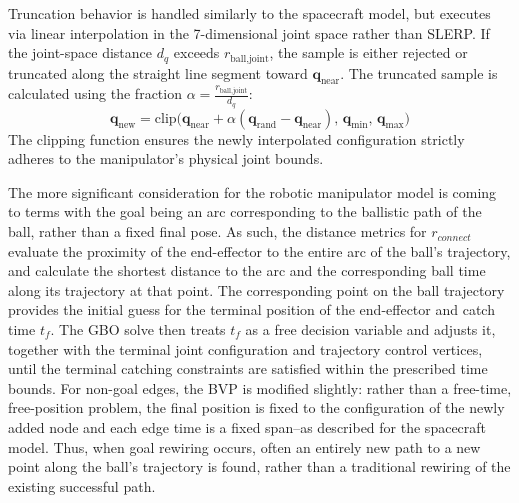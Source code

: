 Truncation behavior is handled similarly to the spacecraft model, but executes via linear interpolation in the 7-dimensional joint space rather than SLERP. 
If the joint-space distance $d_q$ exceeds $r_{\text{ball,joint}}$, the sample is either rejected or truncated along the straight line segment toward $\mathbf{q}_{\text{near}}$. 
The truncated sample is calculated using the fraction $\alpha = \frac{r_{\text{ball,joint}}}{d_q}$:
\begin{equation}
    \mathbf{q}_{\text{new}} = 
    \text{clip}\Big(\mathbf{q}_{\text{near}} + \alpha (\mathbf{q}_{\text{rand}} - \mathbf{q}_{\text{near}}), \, \mathbf{q}_{\min}, \, \mathbf{q}_{\max}\Big)
\end{equation}
The clipping function ensures the newly interpolated configuration strictly adheres to the manipulator's physical joint bounds. 

The more significant consideration for the robotic manipulator model is coming to terms with the goal being an arc corresponding to the ballistic path of the ball, rather than a fixed final pose.
As such, the distance metrics for $r_{connect}$ evaluate the proximity of the end-effector to the entire arc of the ball's trajectory, and calculate the shortest distance to the arc and the corresponding ball time along its trajectory at that point.
The corresponding point on the ball trajectory provides the initial guess for the terminal position of the end-effector and catch time $t_f$.
The \ac{GBO} solve then treats $t_f$ as a free decision variable and adjusts it, together with the terminal joint configuration and trajectory control vertices, until the terminal catching constraints are satisfied within the prescribed time bounds.
For non-goal edges, the \ac{BVP} is modified slightly: rather than a free-time, free-position problem, the final position is fixed to the configuration of the newly added node and each edge time is a fixed span--as described for the spacecraft model.
Thus, when goal rewiring occurs, often an entirely new path to a new point along the ball's trajectory is found, rather than a traditional rewiring of the existing successful path.

